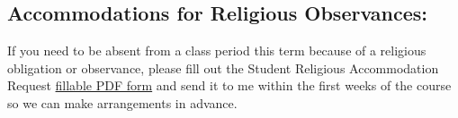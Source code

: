 \subsection*{Accommodations for Religious Observances:}
If you need to be absent from a class period this term because of a religious obligation or observance, please fill out the Student Religious Accommodation Request \href{https://provost.uoregon.edu/religious-observance-accommodations-policy}{fillable PDF form} and send it to me within the first weeks of the course so we can make arrangements in advance. 
